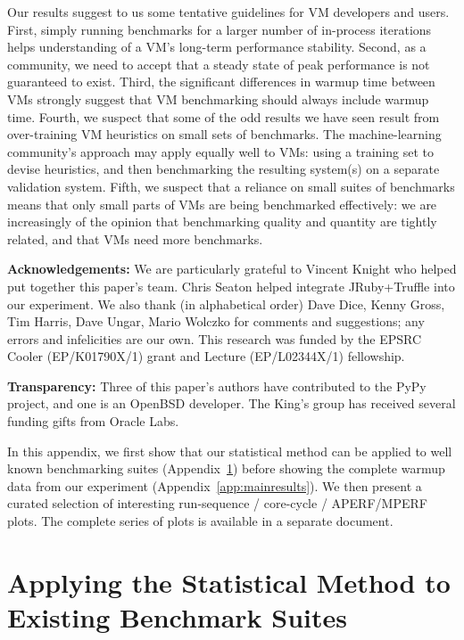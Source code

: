 \documentclass[preprint,numbers,10pt]{sigplanconf}
\begin{document}
Our results suggest to us some tentative guidelines for VM
developers and users. First, simply running benchmarks for a larger number of
in-process iterations helps understanding of a VM's long-term
performance stability. Second, as a community, we need to accept that a steady
state of peak performance is not guaranteed to exist. Third, the significant
differences in warmup time between VMs strongly suggest that VM benchmarking
should always include warmup time. Fourth, we suspect that some of the odd
results we have seen result from over-training VM heuristics on small sets of
benchmarks. The machine-learning community's approach may apply
equally well to VMs: using a training set to devise heuristics, and then
benchmarking the resulting system(s) on a separate validation system. Fifth, we suspect
that a reliance on small suites of benchmarks means that only
small parts of VMs are being benchmarked effectively: we are increasingly of the
opinion that benchmarking quality and quantity are tightly related, and that VMs
need more benchmarks.

\textbf{Acknowledgements:} We are particularly grateful to Vincent Knight
who helped put together this paper's team. Chris Seaton
helped integrate JRuby+Truffle into our experiment. We also thank (in alphabetical order) Dave Dice, Kenny
Gross, Tim Harris, Dave Ungar, Mario Wolczko for comments and suggestions; any
errors and infelicities are our own. This research was funded by the EPSRC
Cooler (EP/K01790X/1) grant and Lecture (EP/L02344X/1) fellowship.

\textbf{Transparency:} Three of this paper's authors have contributed
to the PyPy project, and one is an OpenBSD developer. The
King's group has received several funding gifts from Oracle Labs.




\clearpage

\appendix

\noindent In this appendix, we first show that our statistical method
can be applied to well known benchmarking suites (Appendix~\ref{sec:existing})
before showing the complete warmup data from our experiment
(Appendix~\ref{app:mainresults}). We
then present a curated selection of interesting run-sequence / core-cycle /
APERF/MPERF plots. The complete series of plots is available in a separate
document.


\section{Applying the Statistical Method to Existing Benchmark Suites}
\label{sec:existing}
\end{document}
